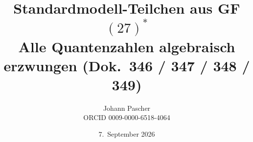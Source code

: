 \documentclass[11pt,a4paper,landscape]{report}
\title{Standardmodell-Teilchen aus GF$(27)^*$\\[0.5em]
  \large Alle Quantenzahlen algebraisch erzwungen
  (Dok.~346 / 347 / 348 / 349)}
\date{7.~September 2026}
\author{Johann Pascher\\\small ORCID 0009-0000-6518-4064}
\begin{document}
\renewcommand{\thechapter}{}
\renewcommand{\thesection}{\arabic{section}}
\maketitle
\tableofcontents

\end{document}
